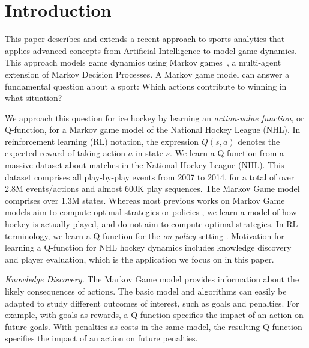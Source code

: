 \documentclass[runningheads,a4paper]{llncs}
\newcommand{\keywords}[1]{\par\addvspace\baselineskip
	\noindent\keywordname\enspace\ignorespaces#1}
\newcommand{\mstate}{s}
\newcommand{\action}{a}
\begin{document}
				
\section{Introduction}

This paper describes and extends a recent approach to sports analytics that applies advanced concepts from Artificial Intelligence to model game dynamics. This approach models game dynamics using Markov games~\cite{Littman1994}, a multi-agent extension of Markov Decision Processes. A Markov game model can answer a fundamental question about a sport: Which actions contribute to winning in what situation? 

We approach this question for ice hockey by learning an {\em action-value function}, or Q-function, for a Markov game model of the National Hockey League (NHL). In reinforcement learning (RL) notation, the expression $Q(\mstate,\action)$ denotes the expected reward of taking action $\action$ in state $\mstate$.
 We learn a Q-function from a massive dataset about matches in the National  Hockey League (NHL). This dataset comprises all play-by-play events from 2007 to 2014, for a total of over 2.8M events/actions and almost 600K play sequences.
The Markov Game model comprises over 1.3M states. Whereas most previous works on Markov Game models aim to compute optimal strategies or policies \cite{Littman1994}, 
we learn a model of how hockey is actually played, and do not aim to compute optimal strategies. In RL terminology, we learn a Q-function for  the {\em on-policy} setting \cite{bib:sutton}. 
%
Motivation for learning a Q-function for NHL hockey dynamics includes knowledge discovery and player evaluation, which is the application we focus on in this paper.

{\em Knowledge Discovery.} The Markov Game model provides information about the likely consequences of actions. The basic model and algorithms can easily be adapted to study different outcomes of interest, such as goals and penalties.
For example, with goals as rewards, a Q-function specifies the impact of an action on future goals. With penalties as costs in the same model, the resulting Q-function specifies the impact of an action on future penalties. 
\end{document}
